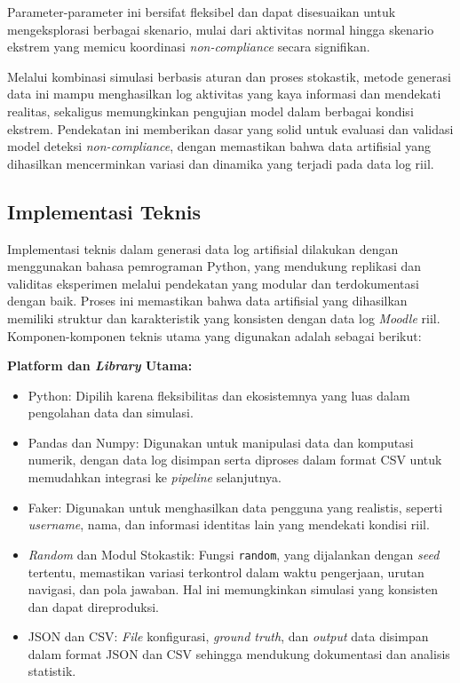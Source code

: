 Parameter-parameter ini bersifat fleksibel dan dapat disesuaikan untuk mengeksplorasi berbagai skenario, mulai dari aktivitas normal hingga skenario ekstrem yang memicu koordinasi \textit{non-compliance} secara signifikan.

Melalui kombinasi simulasi berbasis aturan dan proses stokastik, metode generasi data ini mampu menghasilkan log aktivitas yang kaya informasi dan mendekati realitas, sekaligus memungkinkan pengujian model dalam berbagai kondisi ekstrem. Pendekatan ini memberikan dasar yang solid untuk evaluasi dan validasi model deteksi \textit{non-compliance}, dengan memastikan bahwa data artifisial yang dihasilkan mencerminkan variasi dan dinamika yang terjadi pada data log riil.

\subsection{Implementasi Teknis}
\label{sec:implementasiTeknis}
Implementasi teknis dalam generasi data log artifisial dilakukan dengan menggunakan bahasa pemrograman Python, yang mendukung replikasi dan validitas eksperimen melalui pendekatan yang modular dan terdokumentasi dengan baik. Proses ini memastikan bahwa data artifisial yang dihasilkan memiliki struktur dan karakteristik yang konsisten dengan data log \textit{Moodle} riil. Komponen-komponen teknis utama yang digunakan adalah sebagai berikut:

\textbf{Platform dan \textit{Library} Utama:} \\
\begin{itemize}
    \item Python: Dipilih karena fleksibilitas dan ekosistemnya yang luas dalam pengolahan data dan simulasi.
    \item Pandas dan Numpy: Digunakan untuk manipulasi data dan komputasi numerik, dengan data log disimpan serta diproses dalam format CSV untuk memudahkan integrasi ke \textit{pipeline} selanjutnya.
    \item Faker: Digunakan untuk menghasilkan data pengguna yang realistis, seperti \textit{username}, nama, dan informasi identitas lain yang mendekati kondisi riil.
    \item \textit{Random} dan Modul Stokastik: Fungsi \texttt{random}, yang dijalankan dengan \textit{seed} tertentu, memastikan variasi terkontrol dalam waktu pengerjaan, urutan navigasi, dan pola jawaban. Hal ini memungkinkan simulasi yang konsisten dan dapat direproduksi.
    \item JSON dan CSV: \textit{File} konfigurasi, \textit{ground truth}, dan \textit{output} data disimpan dalam format JSON dan CSV sehingga mendukung dokumentasi dan analisis statistik.
\end{itemize}


